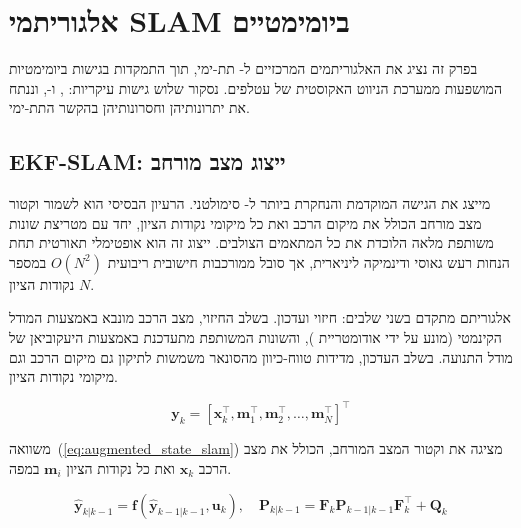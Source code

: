 
\section{אלגוריתמי SLAM ביומימטיים}
\label{sec:slam_algorithms}

בפרק זה נציג את האלגוריתמים המרכזיים ל- תת-ימי, תוך התמקדות בגישות ביומימטיות המושפעות ממערכת הניווט האקוסטית של עטלפים. נסקור שלוש גישות עיקריות: ,  ו-, וננתח את יתרונותיהן וחסרונותיהן בהקשר התת-ימי.

\subsection{EKF-SLAM: ייצוג מצב מורחב}
\label{sec:ekf_slam}

 מייצג את הגישה המוקדמת והנחקרת ביותר ל- סימולטני. הרעיון הבסיסי הוא לשמור וקטור מצב מורחב הכולל את מיקום הרכב ואת כל מיקומי נקודות הציון, יחד עם מטריצת שונות משותפת מלאה הלוכדת את כל המתאמים הצולבים. ייצוג זה הוא אופטימלי תאורטית תחת הנחות רעש גאוסי ודינמיקה ליניארית, אך סובל ממורכבות חישובית ריבועית $O(N^2)$ במספר נקודות הציון $N$.

אלגוריתם  מתקדם בשני שלבים: חיזוי ועדכון. בשלב החיזוי, מצב הרכב מונבא באמצעות המודל הקינמטי (מונע על ידי אודומטריית ), והשונות המשותפת מתעדכנת באמצעות היעקוביאן של מודל התנועה. בשלב העדכון, מדידות טווח-כיוון מהסונאר משמשות לתיקון גם מיקום הרכב וגם מיקומי נקודות הציון.

\begin{equation}
\mathbf{y}_k = [\mathbf{x}_k^\top, \mathbf{m}_1^\top, \mathbf{m}_2^\top, \ldots, \mathbf{m}_N^\top]^\top
\label{eq:augmented_state_slam}
\end{equation}

משוואה~(\ref{eq:augmented_state_slam}) מציגה את וקטור המצב המורחב, הכולל את מצב הרכב $\mathbf{x}_k$ ואת כל נקודות הציון $\mathbf{m}_i$ במפה.

\begin{equation}
\hat{\mathbf{y}}_{k|k-1} = \mathbf{f}(\hat{\mathbf{y}}_{k-1|k-1}, \mathbf{u}_k), \quad \mathbf{P}_{k|k-1} = \mathbf{F}_k \mathbf{P}_{k-1|k-1} \mathbf{F}_k^\top + \mathbf{Q}_k
\label{eq:ekf_prediction_slam}
\end{equation}

